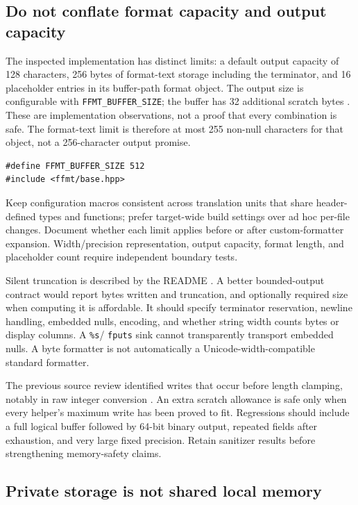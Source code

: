 \documentclass[11pt,letterpaper]{article}
\begin{document}
\subsection{Do not conflate format capacity and output capacity}

The inspected implementation has distinct limits: a default output capacity
of 128 characters, 256 bytes of format-text storage including the terminator,
and 16 placeholder entries in its buffer-path format object. The output size
is configurable with \texttt{FFMT\_BUFFER\_SIZE}; the buffer has 32 additional
scratch bytes \cite{ffmt-source}. These are implementation observations, not
a proof that every combination is safe. The format-text limit is therefore
at most 255 non-null characters for that object, not a 256-character output
promise.

\begin{lstlisting}
#define FFMT_BUFFER_SIZE 512
#include <ffmt/base.hpp>
\end{lstlisting}

Keep configuration macros consistent across translation units that share
header-defined types and functions; prefer target-wide build settings over
ad hoc per-file changes. Document whether each limit applies before or after
custom-formatter expansion. Width/precision representation, output capacity,
format length, and placeholder count require independent boundary tests.

Silent truncation is described by the README \cite{ffmt-readme}. A better
bounded-output contract would report bytes written and truncation, and
optionally required size when computing it is affordable. It should specify
terminator reservation, newline handling, embedded nulls, encoding, and
whether string width counts bytes or display columns. A \texttt{\%s}/
\texttt{fputs} sink cannot transparently transport embedded nulls. A byte
formatter is not automatically a Unicode-width-compatible standard formatter.

The previous source review identified writes that occur before length
clamping, notably in raw integer conversion \cite{ffmt-source}. An extra
scratch allowance is safe only when every helper's maximum write has been
proved to fit. Regressions should include a full logical buffer followed by
64-bit binary output, repeated fields after exhaustion, and very large fixed
precision. Retain sanitizer results before strengthening memory-safety claims.

\subsection{Private storage is not shared local memory}
\end{document}
